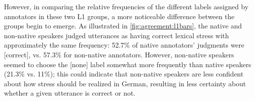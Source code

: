 		
%			
%			
		
		

		However, in comparing the relative frequencies of the different labels assigned by annotators in these two L1 groups, a more noticeable difference between the groups begin to emerge. As illustrated in \cref{fig:agreement:l1bars}, the native and non-native speakers judged utterances as having correct lexical stress with approximately the same frequency: 52.7\% of native annotators' judgments were [correct], vs. 57.3\% for non-native annotators. However, non-native speakers seemed to choose the [none]
		label somewhat more frequently than native speakers (21.3\% vs. 11\%); this could indicate that non-native speakers are less confident about how stress should be realized in German, resulting in less certainty about whether a given utterance is correct or not. 
		

